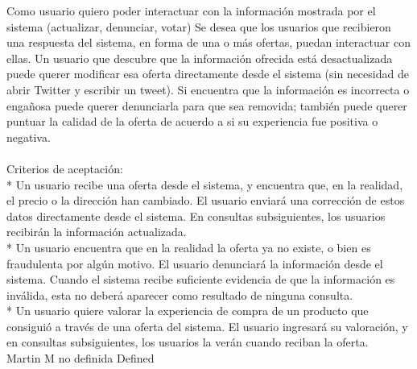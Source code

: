 	{Como usuario quiero poder interactuar con la información mostrada por el sistema (actualizar, denunciar, votar)} %
	{Se desea que los usuarios que recibieron una respuesta del sistema, en forma
de una o más ofertas, puedan interactuar con ellas. Un usuario que descubre
que la información ofrecida está desactualizada puede querer modificar esa
oferta directamente desde el sistema (sin necesidad de abrir Twitter y
escribir un tweet). Si encuentra que la información es incorrecta o engañosa
puede querer denunciarla para que sea removida; también puede querer puntuar
la calidad de la oferta de acuerdo a si su experiencia fue positiva o
negativa.\\
  \\
Criterios de aceptación:\\
* Un usuario recibe una oferta desde el sistema, y encuentra que, en la realidad, el precio o la dirección han cambiado. El usuario enviará una corrección de estos datos directamente desde el sistema. En consultas subsiguientes, los usuarios recibirán la información actualizada.  \\
* Un usuario encuentra que en la realidad la oferta ya no existe, o bien es fraudulenta por algún motivo. El usuario denunciará la información desde el sistema. Cuando el sistema recibe suficiente evidencia de que la información es inválida, esta no deberá aparecer como resultado de ninguna consulta.  \\
* Un usuario quiere valorar la experiencia de compra de un producto que consiguió a través de una oferta del sistema. El usuario ingresará su valoración, y en consultas subsiguientes, los usuarios la verán cuando reciban la oferta.\\
} %
	{} %
	{} %
	{Martin M} %
	{no definida} %
	{Defined} %


\vspace{20pt}

